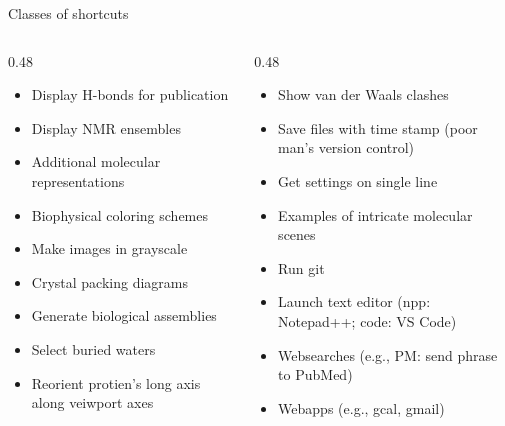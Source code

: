 \begin{frame}{Classes of shortcuts}
    \vspace{0.5em}
    \begin{columns}[T]
          \begin{column}{0.48\linewidth}
  \begin{itemize}[font=$\bullet$\scshape\bfseries]
    \item Display H-bonds for publication 
    \item Display NMR ensembles
    \item Additional molecular representations
    \item Biophysical coloring schemes
    \item Make images in grayscale 
    \item Crystal packing diagrams
    \item Generate biological assemblies
    \item Select buried waters 
    \item Reorient protien's long axis along veiwport axes
  \end{itemize}
\end{column}      
     \begin{column}{0.48\linewidth}
 \begin{itemize}[font=$\bullet$\scshape\bfseries]
   \item Show van der Waals clashes     
   \item Save files with time stamp (poor man's version control)
   \item Get settings on single line
   \item Examples of intricate molecular scenes
   \item Run git
   \item Launch text editor (npp: Notepad++; code: VS Code)
   \item Websearches (e.g., PM: send phrase to PubMed)
   \item Webapps (e.g., gcal, gmail)      
 \end{itemize}
 \end{column}         
\end{columns}          
         
\end{frame}
